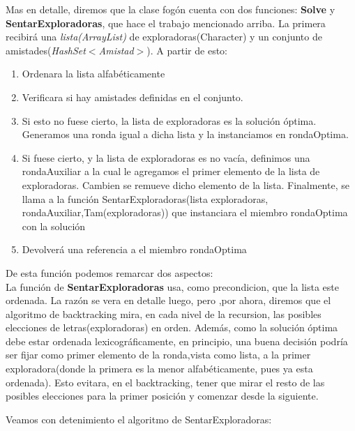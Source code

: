 \documentclass[10pt, a4paper]{article}
\begin{document}
Mas en detalle, diremos que la clase fogón cuenta con dos funciones: \textbf{Solve} y \textbf{SentarExploradoras}, que hace el trabajo mencionado arriba.
La primera recibirá una \textit{lista(ArrayList)} de exploradoras(Character) y un conjunto de amistades(\textit{HashSet$<$Amistad$>$}). A partir de esto:
\begin{enumerate}

\item Ordenara la lista alfabéticamente

\item Verificara si hay amistades definidas en el conjunto. 

\item Si esto no fuese cierto, la lista de exploradoras es la solución óptima. Generamos una ronda igual a dicha lista y la instanciamos en rondaOptima.

\item Si fuese cierto, y la lista de exploradoras es no vacía, definimos una rondaAuxiliar a la cual le agregamos el primer elemento de la lista de exploradoras. Cambien se remueve dicho elemento de la lista. Finalmente, se llama a la función SentarExploradoras(lista exploradoras, rondaAuxiliar,Tam(exploradoras)) que instanciara el miembro rondaOptima con la solución

\item Devolverá una referencia a el miembro rondaOptima
\end{enumerate}
  
De esta función podemos remarcar dos aspectos:\\

La función de \textbf{SentarExploradoras} usa, como precondicion, que la lista este ordenada. La razón se vera en detalle luego, pero ,por ahora, diremos que el algoritmo de backtracking mira, en cada nivel de la recursion, las posibles elecciones de letras(exploradoras) en orden.
Además, como la solución óptima debe estar ordenada lexicográficamente, en principio, una buena decisión podría ser fijar como primer elemento de la ronda,vista como lista, a la primer exploradora(donde la primera es la menor alfabéticamente, pues ya esta ordenada). Esto evitara, en el backtracking, tener que mirar el resto de las posibles elecciones para la primer posición y comenzar desde la siguiente.

Veamos con detenimiento el algoritmo de SentarExploradoras:
\end{document}
